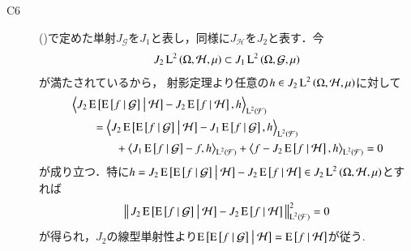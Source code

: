 \begin{prf}
\begin{description}
			\item[C6] 
				()で定めた単射$J_{\mathcal{G}}$を$J_1$と表し，同様に$J_{\mathcal{H}}$を$J_2$と表す．今
				\begin{align}
					J_2 \operatorname{L}^{2} \left(\Omega, \mathcal{H},\mu\right) \subset J_1 \operatorname{L}^{2} \left(\Omega, \mathcal{G},\mu\right)
				\end{align}
				が満たされているから，
				射影定理より任意の$h \in J_2 \operatorname{L}^{2} \left(\Omega, \mathcal{H},\mu\right)$に対して
				\begin{align}
					&\inprod<J_2 \cexp{\cexp{f}{\mathcal{G}}}{\mathcal{H}} - J_2 \cexp{f}{\mathcal{H}}, h>_{\Lp{2}{\mathcal{F}}} \\
					&\qquad = \inprod<J_2 \cexp{\cexp{f}{\mathcal{G}}}{\mathcal{H}} - J_1 \cexp{f}{\mathcal{G}}, h>_{\Lp{2}{\mathcal{F}}} \\
						&\qquad \qquad + \inprod<J_1 \cexp{f}{\mathcal{G}} - f, h>_{\Lp{2}{\mathcal{F}}} + \inprod<f - J_2 \cexp{f}{\mathcal{H}}, h>_{\Lp{2}{\mathcal{F}}}
					= 0
				\end{align}
				が成り立つ．特に$h = J_2 \operatorname{E} \left[ \operatorname{E} \left[ f \ \middle|\ \mathcal{G} \right] \ \middle|\ \mathcal{H} \right] - J_2 \operatorname{E} \left[ f \ \middle|\ \mathcal{H} \right] \in J_2 \operatorname{L}^{2} \left(\Omega, \mathcal{H},\mu\right)$とすれば
				\begin{align}
					\left\|\, J_2 \operatorname{E} \left[ \operatorname{E} \left[ f \ \middle|\ \mathcal{G} \right] \ \middle|\ \mathcal{H} \right] - J_2 \operatorname{E} \left[ f \ \middle|\ \mathcal{H} \right]\, \right\|_{\operatorname{L}^{2} \left(\mathcal{F}\right)}^2 = 0
				\end{align}
				が得られ，$J_2$の線型単射性より$\operatorname{E} \left[ \operatorname{E} \left[ f \ \middle|\ \mathcal{G} \right] \ \middle|\ \mathcal{H} \right] = \operatorname{E} \left[ f \ \middle|\ \mathcal{H} \right]$が従う.
				\QED
		\end{description}
	\end{prf}
